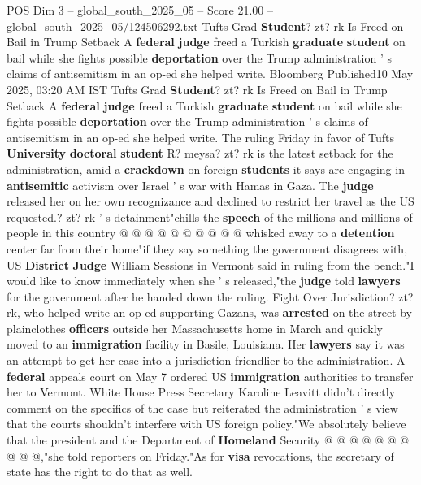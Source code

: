 \begin{textsample}{POS Dim 3 – global\_south\_2025\_05 – Score 21.00 – global\_south\_2025\_05/124506292.txt}  \label{ex:f3_pos_233}
Tufts Grad \textbf{Student}? zt? rk Is Freed on Bail in Trump Setback A \textbf{federal} \textbf{judge} freed a Turkish \textbf{graduate} \textbf{student} on bail while she fights possible \textbf{deportation} over the Trump administration ' s claims of antisemitism in an op-ed she helped write.
Bloomberg Published10 May 2025, 03:20 AM IST Tufts Grad \textbf{Student}? zt? rk Is Freed on Bail in Trump Setback A \textbf{federal} \textbf{judge} freed a Turkish \textbf{graduate} \textbf{student} on bail while she fights possible \textbf{deportation} over the Trump administration ' s claims of antisemitism in an op-ed she helped write.
The ruling Friday in favor of Tufts \textbf{University} \textbf{doctoral} \textbf{student} R? meysa? zt? rk is the latest setback for the administration, amid a \textbf{crackdown} on foreign \textbf{students} it says are engaging in \textbf{antisemitic} activism over Israel ' s war with Hamas in Gaza.
The \textbf{judge} released her on her own recognizance and declined to restrict her travel as the US requested.? zt? rk ' s detainment"chills the \textbf{speech} of the millions and millions of people in this country @ @ @ @ @ @ @ @ @ @ whisked away to a \textbf{detention} center far from their home"if they say something the government disagrees with, US \textbf{District} \textbf{Judge} William Sessions in Vermont said in ruling from the bench."I would like to know immediately when she ' s released,"the \textbf{judge} told \textbf{lawyers} for the government after he handed down the ruling.
Fight Over Jurisdiction? zt? rk, who helped write an op-ed supporting Gazans, was \textbf{arrested} on the street by plainclothes \textbf{officers} outside her Massachusetts home in March and quickly moved to an \textbf{immigration} facility in Basile, Louisiana.
Her \textbf{lawyers} say it was an attempt to get her case into a jurisdiction friendlier to the administration.
A \textbf{federal} appeals court on May 7 ordered US \textbf{immigration} authorities to transfer her to Vermont.
White House Press Secretary Karoline Leavitt didn't directly comment on the specifics of the case but reiterated the administration ' s view that the courts shouldn't interfere with US foreign policy."We absolutely believe that the president and the Department of \textbf{Homeland} Security @ @ @ @ @ @ @ @ @ @,"she told reporters on Friday."As for \textbf{visa} revocations, the secretary of state has the right to do that as well.

\end{textsample}
